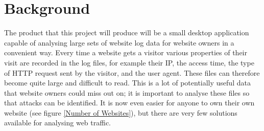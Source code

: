 \section{Background}

The product that this project will produce will be a small desktop application capable of analysing large sets of website log data for website owners in a convenient way. Every time a website gets a visitor various properties of their visit are recorded in the log files, for example their IP, the access time, the type of HTTP request sent by the visitor, and the user agent. These files can therefore become quite large and difficult to read. This is a lot of potentially useful data that website owners could miss out on; it is important to analyse these files so that attacks can be identified. It is now even easier for anyone to own their own website (see figure \ref{Number of Websites}), but there are very few solutions available for analysing web traffic.

